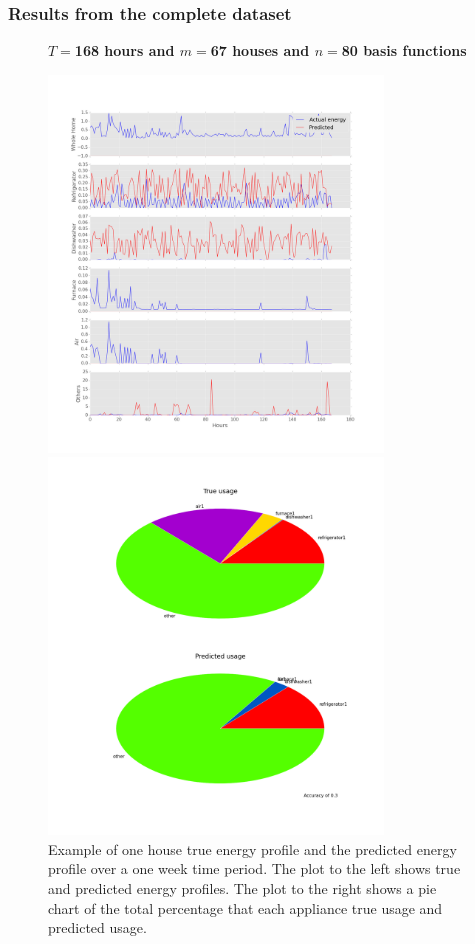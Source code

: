 \subsubsection{Results from the complete dataset}
\label{sec:complete}
\begin{figure}[H]
	\centering
	\textbf{$T=$168 hours and $m=$67 houses and $n=$80 basis functions}\par\medskip
	\begin{minipage}{.65\textwidth}
		\centering
		\includegraphics[width=\textwidth,height=10cm]{./figures/results/normal_appliances_67_168}
	\end{minipage}%
	\begin{minipage}{.4 \textwidth}
		\centering
		\includegraphics[width=\textwidth,height=10cm]{./figures/results/normal_pie_chart_67_168}
	\end{minipage}
	\caption{Example of one house true energy profile and the predicted energy profile over a one week time period. The plot to the left shows true and predicted energy profiles. The plot to the right shows a pie chart of the total percentage that each appliance true usage and predicted usage.}
	\label{fig:normal_168}
\end{figure}

